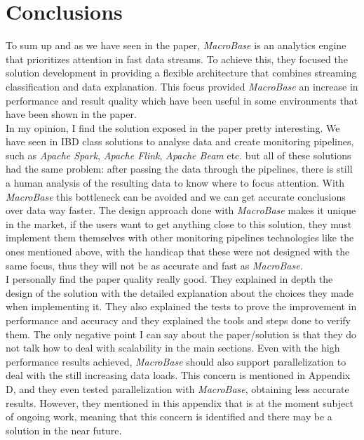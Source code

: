 \documentclass[11pt, titlepage]{article}
\begin{document}
	\section{Conclusions}
		To sum up and as we have seen in the paper, \textit{MacroBase} is an analytics engine that prioritizes attention in fast data streams. To achieve this, they focused the solution development in providing a flexible architecture that combines streaming classification and data explanation. This focus provided \textit{MacroBase} an increase in performance and result quality which have been useful in some environments that have been shown in the paper.
		\\In my opinion, I find the solution exposed in the paper pretty interesting. We have seen in IBD class solutions to analyse data and create monitoring pipelines, such as \textit{Apache Spark}, \textit{Apache Flink}, \textit{Apache Beam} etc. but all of these solutions had the same problem: after passing the data through the pipelines, there is still a human analysis of the resulting data to know where to focus attention. With \textit{MacroBase} this bottleneck can be avoided and we can get accurate conclusions over data way faster. The design approach done with \textit{MacroBase} makes it unique in the market, if the users want to get anything close to this solution, they must implement them themselves with other monitoring pipelines technologies like the ones mentioned above, with the handicap that these were not designed with the same focus, thus they will not be as accurate and fast as \textit{MacroBase}.
		\\I personally find the paper quality really good. They explained in depth the design of the solution with the detailed explanation about the choices they made when implementing it. They also explained the tests to prove the improvement in performance and accuracy and they explained the tools and steps done to verify them. The only negative point I can say about the paper/solution is that they do not talk how to deal with scalability in the main sections. Even with the high performance results achieved, \textit{MacroBase} should also support parallelization to deal with the still increasing data loads. This concern is mentioned in Appendix D, and they even tested parallelization with \textit{MacroBase}, obtaining less accurate results. However, they mentioned in this appendix that is at the moment subject of ongoing work, meaning that this concern is identified and there may be a solution in the near future. 
\end{document}
